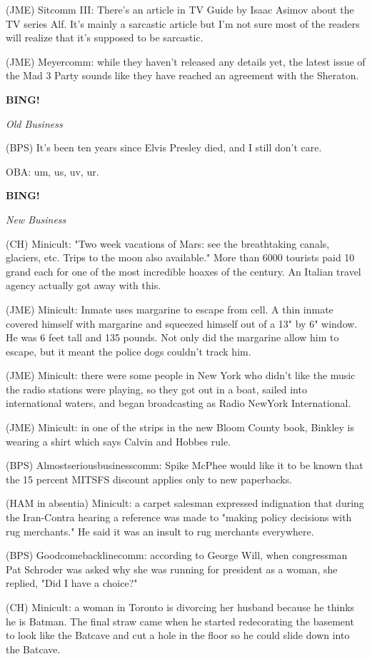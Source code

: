 \documentclass[12pt]{article}
\newcommand{\bing}{{\bf BING!} }
\newcommand{\goto}[1]{\bing \vskip 12pt \centerline{{\em{#1}}}}
\begin{document}
(JME) Sitcomm III: There's an article in TV Guide by Isaac Asimov about the TV series Alf. It's mainly a sarcastic article but I'm not sure most of the readers will realize that it's supposed to be sarcastic.

(JME) Meyercomm: while they haven't released any details yet, the latest issue of the Mad 3 Party sounds like they have reached an agreement with the Sheraton.

\goto{Old Business}

(BPS) It's been ten years since Elvis Presley died, and I still don't care.

OBA: um, us, uv, ur.

\goto{New Business}

(CH) Minicult: "Two week vacations of Mars: see the breathtaking canals, glaciers, etc. Trips to the moon also available." More than 6000 tourists paid 10 grand each for one of the most incredible hoaxes of the century. An Italian travel agency actually got away with this.

(JME) Minicult: Inmate uses margarine to escape from cell. A thin inmate covered himself with margarine and squeezed himself out of a 13" by 6" window. He was 6 feet tall and 135 pounds. Not only did the margarine allow him to escape, but it meant the police dogs couldn't track him.

(JME) Minicult: there were some people in New York who didn't like the music the radio stations were playing, so they got out in a boat, sailed into international waters, and began broadcasting as Radio NewYork International.

(JME) Minicult: in one of the strips in the new Bloom County book, Binkley is wearing a shirt which says Calvin and Hobbes rule.

(BPS) Almostseriousbusinesscomm: Spike McPhee would like it to be known that the 15 percent MITSFS discount applies only to new paperbacks.

(HAM in absentia) Minicult: a carpet salesman expressed indignation that during the Iran-Contra hearing a reference was made to "making policy decisions with rug merchants." He said it was an insult to rug merchants everywhere.

(BPS) Goodcomebacklinecomm: according to George Will, when congressman Pat Schroder was asked why she was running for president as a woman, she replied, "Did I have a choice?"

(CH) Minicult: a woman in Toronto is divorcing her husband because he thinks he is Batman. The final straw came when he started redecorating the basement to look like the Batcave and cut a hole in the floor so he could slide down into the Batcave.
\end{document}
